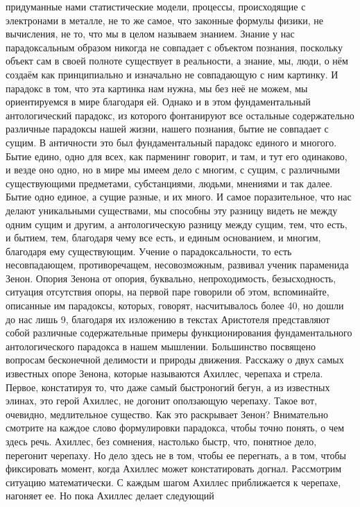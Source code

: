 придуманные нами статистические модели, процессы, происходящие с электронами в
металле, не то же самое, что законные формулы физики, не вычисления, не то, что
мы в целом называем знанием. Знание у нас парадоксальным образом никогда не
совпадает с объектом познания, поскольку объект сам в своей полноте существует в
реальности, а знание, мы, люди, о нём создаём как принципиально и изначально не
совпадающую с ним картинку. И парадокс в том, что эта картинка нам нужна, мы без
неё не можем, мы ориентируемся в мире благодаря ей. Однако и в этом
фундаментальный антологический парадокс, из которого фонтанируют все остальные
содержательно различные парадоксы нашей жизни, нашего познания, бытие не
совпадает с сущим. В античности это был фундаментальный парадокс единого и
многого. Бытие едино, одно для всех, как парменинг говорит, и там, и тут его
одинаково, и везде оно одно, но в мире мы имеем дело с многим, с сущим, с
различными существующими предметами, субстанциями, людьми, мнениями и так далее.
Бытие одно единое, а сущие разные, и их много. И самое поразительное, что нас
делают уникальными существами, мы способны эту разницу видеть не между одним
сущим и другим, а антологическую разницу между сущим, тем, что есть, и бытием,
тем, благодаря чему все есть, и единым основанием, и многим, благодаря ему
существующим. Учение о парадоксальности, то есть несовпадающем, противоречащем,
несовозможным, развивал ученик параменида Зенон. Опория Зенона от опория,
буквально, непроходимость, безысходность, ситуация отсутствия опоры, на первой
паре говорили об этом, вспоминайте, описанные им парадоксы, которых, говорят,
насчитывалось более 40, но дошли до нас лишь 9, благодаря их изложению в текстах
Аристотеля представляют собой различные содержательные примеры функционирования
фундаментального антологического парадокса в нашем мышлении. Большинство
посвящено вопросам бесконечной делимости и природы движения. Расскажу о двух
самых известных опоре Зенона, которые называются Ахиллес, черепаха и стрела.
Первое, констатируя то, что даже самый быстроногий бегун, а из известных элинах,
это герой Ахиллес, не догонит оползающую черепаху. Такое вот, очевидно,
медлительное существо. Как это раскрывает Зенон? Внимательно смотрите на каждое
слово формулировки парадокса, чтобы точно понять, о чем здесь речь. Ахиллес, без
сомнения, настолько быстр, что, понятное дело, перегонит черепаху. Но дело здесь
не в том, чтобы ее перегнать, а в том, чтобы фиксировать момент, когда Ахиллес
может констатировать догнал. Рассмотрим ситуацию математически. С каждым шагом
Ахиллес приближается к черепахе, нагоняет ее. Но пока Ахиллес делает следующий

